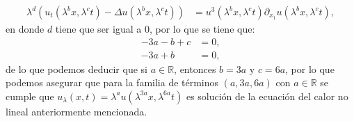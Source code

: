 \begin{homeworkProblem}
\begin{solucion}
\begin{enumerate}
\begin{align*}
          \lambda^{d}(u_{t}(\lambda^{b}x,\lambda^{c}t)-\Delta u(\lambda^{b}x,\lambda^{c}t))&=u^3(\lambda^{b}x,\lambda^{c}t)\partial_{x_1}u(\lambda^{b}x,\lambda^{c}t),
        \end{align*}
        en donde $d$ tiene que ser igual a $0$, por lo que se tiene que:
        \begin{align*}
          -3a-b+c&=0,\\
          -3a+b&=0,
        \end{align*}
        de lo que podemos deducir que si $a\in\mathbb{R}$, entonces $b=3a$ y $c=6a$, por lo que podemos asegurar que para la familia de términos $(a,3a,6a)$ con $a\in\mathbb{R}$ se cumple que $u_{\lambda}(x,t)=\lambda^{a}u(\lambda^{3a}x,\lambda^{6a}t)$ es solución de la ecuación del calor no lineal anteriormente mencionada.
        \demostrado
    \end{enumerate}
  \end{solucion}  
\end{homeworkProblem}
